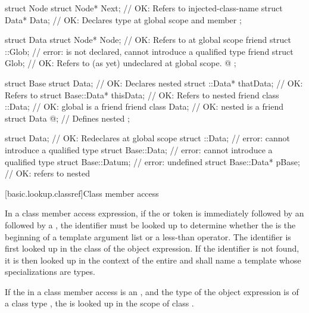 \pnum
\begin{example}
\begin{codeblock}
struct Node {
  struct Node* Next;            // OK: Refers to injected-class-name 
  struct Data* Data;            // OK: Declares type  at global scope and member 
};

struct Data {
  struct Node* Node;            // OK: Refers to  at global scope
  friend struct ::Glob;         // error:  is not declared, cannot introduce a qualified type
  friend struct Glob;           // OK: Refers to (as yet) undeclared  at global scope.
  @\commentellip@
};

struct Base {
  struct Data;                  // OK: Declares nested 
  struct ::Data*     thatData;  // OK: Refers to 
  struct Base::Data* thisData;  // OK: Refers to nested 
  friend class ::Data;          // OK: global  is a friend
  friend class Data;            // OK: nested  is a friend
  struct Data { @\commentellip@ };    // Defines nested 
};

struct Data;                    // OK: Redeclares  at global scope
struct ::Data;                  // error: cannot introduce a qualified type
struct Base::Data;              // error: cannot introduce a qualified type
struct Base::Datum;             // error:  undefined
struct Base::Data* pBase;       // OK: refers to nested 
\end{codeblock}
\end{example} %
%

[basic.lookup.classref]{Class member access}

\pnum
{}%
In a class member access expression, if the 
or \tcode{->} token is immediately followed by an 
followed by a \tcode{<}, the identifier must be looked up to determine
whether the \tcode{<} is the beginning of a template argument
list or a less-than operator. The identifier is first
looked up in the class of the object expression.
If the identifier is not found,
it is then looked up in the context of the entire
 and shall name a template
whose specializations are types.

\pnum
If the  in a class member
access is an , and the type of
the object expression is of a class type , the
 is looked up
in the scope of class .

